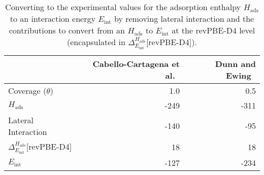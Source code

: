 \begin{table}[h]
\caption{\label{tab:nacl_expt_hads_eint}Converting to the experimental values for the adsorption enthalpy $H_\text{ads}$ to an interaction energy $E_\text{int}$ by removing lateral interaction and the contributions to convert from an $H_\textrm{ads}$ to $E_\textrm{int}$ at the revPBE-D4 level (encapsulated in $\Delta^{H_\text{ads}}_{E_\text{int}}$[revPBE-D4]).}
\begin{adjustbox}{center,max width=1\textwidth}
\begin{tabular}{lrr}
\toprule
 & Cabello-Cartagena et al.~\cite{cabello-cartagenaStructureInfraredAbsorption2010} & Dunn and Ewing~\cite{dunnInfraredSpectraStructure1992} \\ 
\midrule
Coverage ($\theta$) & 1.0 & 0.5 \\
$H_\text{ads}$ & -249 & -311 \\
Lateral Interaction~\cite{alloucheQuantumInitioStudy1997,picaudPhononlibronDynamicsAcetylene1998} & -140 & -95 \\
$\Delta^{H_\text{ads}}_{E_\text{int}}$[revPBE-D4] & 18 & 18 \\
$E_\text{int}$ & -127 & -234 \\
\bottomrule
\end{tabular}
\end{adjustbox}
\end{table}
